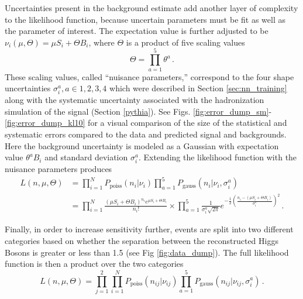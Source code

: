     Uncertainties present in the background estimate add another layer of complexity to the likelihood function,
        because uncertain parameters must be fit as well as the parameter of interest.
    The expectation value is further adjusted to be $\nu_i(\mu, \Theta) = \mu S_i + \Theta B_i$,
        where $\Theta$ is a product of five scaling values 
    \begin{equation}
        \Theta = \prod \limits_{a=1}^{5}  \theta^a
        \,.
    \end{equation}
    These scaling values, called ``nuisance parameters,''
        correspond to the four \mhh shape uncertainties $\sigma_i^a, a\in{1,2,3,4}$
        which were described in Section \ref{sec:nn_training}
        along with the systematic uncertainty associated with the hadronization simulation of the signal (Section \ref{pythia}).
    See Figs. \ref{fig:error_dump_sm}-\ref{fig:error_dump_kl10} for a visual comparison of the size of the statistical and systematic errors
        compared to the data and predicted signal and backgrounds.
    Here the background uncertainty is modeled as a Gaussian with expectation value $\theta^a B_i$ and standard deviation $\sigma_i^a$.
    Extending the likelihood function with the nuisance parameters produces
    \begin{equation} \begin{split}
        L(n,\mu,\Theta) &= \prod \limits_{i=1}^{N} P_{\textrm{poiss}}(n_i | \nu_i) 
             \prod \limits_{a=1}^{5} P_{\textrm{gauss}}(n_i | \nu_i, \sigma_i^a) 
        \\&= \prod \limits_{i=1}^{N} \frac{ (\mu S_i + \Theta B_i)^{n_i} e^{\mu S_i + \Theta B_i} }{n_i!} \times
            \prod \limits_{a=1}^5 \frac{1}{\sigma_i^a \sqrt{2\pi}} e^{
                -\frac{1}{2}\left(\frac{n_i- (\mu S_i + \Theta B_i)}{\sigma_i^a}\right)^2
            }
        \,.
    \end{split} \end{equation}

    Finally, in order to increase sensitivity further, events are split into two different categories
        based on whether the \deta separation between the reconstructed Higgs Bosons is greater or less than 1.5 (see Fig \ref{fig:data_dump}).
    The full likelihood function is then a product over the two categories
    \begin{equation}
        L(n,\mu,\Theta) = \prod \limits_{j=1}^{2}
             \prod \limits_{i=1}^{N} P_{\textrm{poiss}}(n_{ij} | \nu_{ij}) 
             \prod \limits_{a=1}^{5} P_{\textrm{gauss}}(n_{ij} | \nu_{ij}, \sigma_{i}^a) 
        \,.
    \end{equation}


